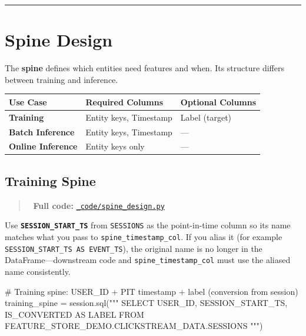\documentclass[
  letterpaper,
  DIV=11,
  numbers=noendperiod]{scrreprt}
\newenvironment{Shaded}{\begin{snugshade}}{\end{snugshade}}
\newcommand{\CommentTok}[1]{\textcolor[rgb]{0.37,0.37,0.37}{#1}}
\newcommand{\NormalTok}[1]{\textcolor[rgb]{0.00,0.23,0.31}{#1}}
\newcommand{\OperatorTok}[1]{\textcolor[rgb]{0.37,0.37,0.37}{#1}}
\newcommand{\StringTok}[1]{\textcolor[rgb]{0.13,0.47,0.30}{#1}}
\begin{document}
\begin{center}\rule{0.5\linewidth}{0.5pt}\end{center}

\hypertarget{spine-design}{%
\section{Spine Design}\label{spine-design}}

The \textbf{spine} defines which entities need features and when. Its
structure differs between training and inference.

\begin{longtable}[]{@{}lll@{}}
\toprule\noalign{}
Use Case & Required Columns & Optional Columns \\
\midrule\noalign{}
\endhead
\bottomrule\noalign{}
\endlastfoot
\textbf{Training} & Entity keys, Timestamp & Label (target) \\
\textbf{Batch Inference} & Entity keys, Timestamp & --- \\
\textbf{Online Inference} & Entity keys only & --- \\
\end{longtable}

\hypertarget{training-spine-1}{%
\subsection{Training Spine}\label{training-spine-1}}

\begin{quote}
📁 \textbf{Full code:}
\href{_code/spine_design.py}{\texttt{\_code/spine\_design.py}}
\end{quote}

Use \textbf{\texttt{SESSION\_START\_TS}} from \texttt{SESSIONS} as the
point-in-time column so its name matches what you pass to
\texttt{spine\_timestamp\_col}. If you alias it (for example
\texttt{SESSION\_START\_TS\ AS\ EVENT\_TS}), the original name is no
longer in the DataFrame---downstream code and
\texttt{spine\_timestamp\_col} must use the aliased name consistently.

\begin{Shaded}
\begin{Highlighting}[]
\CommentTok{\# Training spine: USER\_ID + PIT timestamp + label (conversion from session)}
\NormalTok{training\_spine }\OperatorTok{=}\NormalTok{ session.sql(}\StringTok{"""}
\StringTok{    SELECT}
\StringTok{        USER\_ID,}
\StringTok{        SESSION\_START\_TS,}
\StringTok{        IS\_CONVERTED AS LABEL}
\StringTok{    FROM FEATURE\_STORE\_DEMO.CLICKSTREAM\_DATA.SESSIONS}
\StringTok{"""}\NormalTok{)}
\end{Highlighting}
\end{Shaded}
\end{document}
